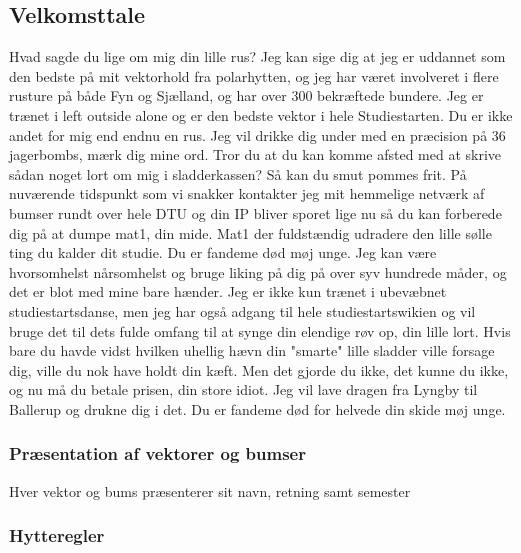 \documentclass[../../../main.tex]{subfiles}
\begin{document}
\subsection{Velkomsttale}

Hvad sagde du lige om mig din lille rus? Jeg kan sige dig at jeg er uddannet som den bedste på mit vektorhold fra polarhytten, og jeg har været involveret i flere rusture på både Fyn og Sjælland, og har over 300 bekræftede bundere. Jeg er trænet i left outside alone og er den bedste vektor i hele Studiestarten. Du er ikke andet for mig end endnu en rus. Jeg vil drikke dig under med en præcision på 36 jagerbombs, mærk dig mine ord. Tror du at du kan komme afsted med at skrive sådan noget lort om mig i sladderkassen? Så kan du smut pommes frit. På nuværende tidspunkt som vi snakker kontakter jeg mit hemmelige netværk af bumser rundt over hele DTU og din IP bliver sporet lige nu så du kan forberede dig på at dumpe mat1, din mide. Mat1 der fuldstændig udradere den lille sølle ting du kalder dit studie. Du er fandeme død møj unge. Jeg kan være hvorsomhelst nårsomhelst og bruge liking på dig på over syv hundrede måder, og det er blot med mine bare hænder. Jeg er ikke kun trænet i ubevæbnet studiestartsdanse, men jeg har også adgang til hele studiestartswikien og vil bruge det til dets fulde omfang til at synge din elendige røv op, din lille lort. Hvis bare du havde vidst hvilken uhellig hævn din "smarte" lille sladder ville forsage dig, ville du nok have holdt din kæft. Men det gjorde du ikke, det kunne du ikke, og nu må du betale prisen, din store idiot. Jeg vil lave dragen fra Lyngby til Ballerup og drukne dig i det. Du er fandeme død for helvede din skide møj unge.

\subsubsection{Præsentation af vektorer og bumser}
Hver vektor og bums præsenterer sit navn, retning samt semester


\subsubsection{Hytteregler}
\end{document}
